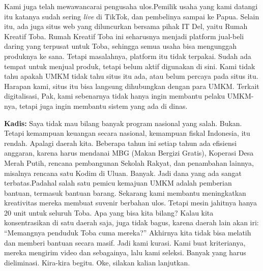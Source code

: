 {\noindent Kami juga telah mewawancarai pengusaha ulos.Pemilik usaha yang kami datangi itu katanya sudah sering \textit{live} di TikTok, dan pembelinya sampai ke Papua. Selain itu, ada juga situs web yang diluncurkan bersama pihak IT Del, yaitu Rumah Kreatif Toba. Rumah Kreatif Toba ini seharusnya menjadi platform jual-beli daring yang terpusat untuk Toba, sehingga semua usaha bisa mengunggah produknya ke sana. Tetapi masalahnya, platform itu tidak terpakai. Sudah ada tempat untuk menjual produk, tetapi belum aktif digunakan di sini. Kami tidak tahu apakah UMKM tidak tahu situs itu ada, atau belum percaya pada situs itu. Harapan kami, situs itu bisa langsung dihubungkan dengan para UMKM. Terkait digitalisasi, Pak, kami sebenarnya tidak hanya ingin membantu pelaku UMKM-nya, tetapi juga ingin membantu sistem yang ada di dinas.

\noindent \textbf{Kadis:} Saya tidak mau bilang banyak program nasional yang salah. Bukan. Tetapi kemampuan keuangan secara nasional, kemampuan fiskal Indonesia, itu rendah. Apalagi daerah kita. Beberapa tahun ini setiap tahun ada efisiensi anggaran, karena harus mendanai MBG (Makan Bergizi Gratis), Koperasi Desa Merah Putih, rencana pembangunan Sekolah Rakyat, dan penambahan lainnya, misalnya rencana satu Kodim di Uluan. Banyak. Jadi dana yang ada sangat terbatas.Padahal salah satu pemicu kemajuan UMKM adalah pemberian bantuan, termasuk bantuan barang. Sekarang kami membantu meningkatkan kreativitas mereka membuat suvenir berbahan ulos. Tetapi mesin jahitnya hanya 20 unit untuk seluruh Toba. Apa yang bisa kita bilang? Kalau kita konsentrasikan di satu daerah saja, juga tidak bagus, karena daerah lain akan iri: ``Memangnya penduduk Toba cuma mereka?'' Akhirnya kita tidak bisa melatih dan memberi bantuan secara masif. Jadi kami kurasi. Kami buat kriterianya, mereka mengirim video dan sebagainya, lalu kami seleksi. Banyak yang harus dieliminasi. Kira-kira begitu. Oke, silakan kalian lanjutkan.
}

